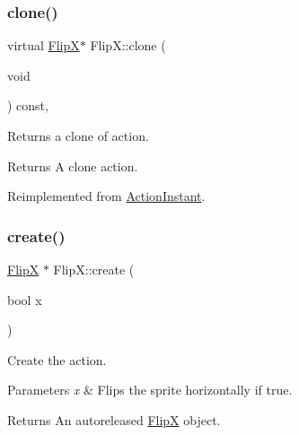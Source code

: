 \mbox{\label{classFlipX_a66d81c1b3dfced40fad2cc6557de72ec}} 
\subsubsection{\texorpdfstring{clone()}{clone()}\hspace{0.1cm}{\footnotesize\ttfamily [2/2]}}
{\footnotesize\ttfamily virtual \hyperlink{classFlipX}{FlipX}$\ast$ Flip\+X\+::clone (\begin{DoxyParamCaption}\item[{void}]{ }\end{DoxyParamCaption}) const\hspace{0.3cm}{\ttfamily [override]}, {\ttfamily [virtual]}}

Returns a clone of action.

\begin{DoxyReturn}{Returns}
A clone action. 
\end{DoxyReturn}


Reimplemented from \hyperlink{classActionInstant_adb76fc6f006098109e8256210cbd8cc0}{Action\+Instant}.

\mbox{\label{classFlipX_a69e09dd858edb74128bdc4b5716de2f7}} 
\subsubsection{\texorpdfstring{create()}{create()}\hspace{0.1cm}{\footnotesize\ttfamily [1/2]}}
{\footnotesize\ttfamily \hyperlink{classFlipX}{FlipX} $\ast$ Flip\+X\+::create (\begin{DoxyParamCaption}\item[{bool}]{x }\end{DoxyParamCaption})\hspace{0.3cm}{\ttfamily [static]}}

Create the action.


\begin{DoxyParams}{Parameters}
{\em x} & Flips the sprite horizontally if true. \\
\hline
\end{DoxyParams}
\begin{DoxyReturn}{Returns}
An autoreleased \hyperlink{classFlipX}{FlipX} object. 
\end{DoxyReturn}
\mbox{\label{classFlipX_a94a9de71315781e0742fd403626646e9}} 
